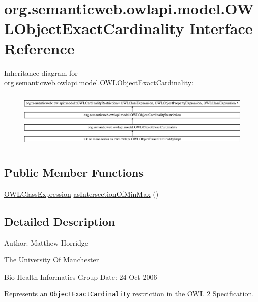 \hypertarget{interfaceorg_1_1semanticweb_1_1owlapi_1_1model_1_1_o_w_l_object_exact_cardinality}{\section{org.\-semanticweb.\-owlapi.\-model.\-O\-W\-L\-Object\-Exact\-Cardinality Interface Reference}
\label{interfaceorg_1_1semanticweb_1_1owlapi_1_1model_1_1_o_w_l_object_exact_cardinality}
}
Inheritance diagram for org.\-semanticweb.\-owlapi.\-model.\-O\-W\-L\-Object\-Exact\-Cardinality\-:\begin{figure}[H]
\begin{center}
\leavevmode
\includegraphics[height=2.758621cm]{interfaceorg_1_1semanticweb_1_1owlapi_1_1model_1_1_o_w_l_object_exact_cardinality}
\end{center}
\end{figure}
\subsection*{Public Member Functions}
\begin{DoxyCompactItemize}
\item 
\hyperlink{interfaceorg_1_1semanticweb_1_1owlapi_1_1model_1_1_o_w_l_class_expression}{O\-W\-L\-Class\-Expression} \hyperlink{interfaceorg_1_1semanticweb_1_1owlapi_1_1model_1_1_o_w_l_object_exact_cardinality_a5271b197bbf2006e374e4e0863425358}{as\-Intersection\-Of\-Min\-Max} ()
\end{DoxyCompactItemize}


\subsection{Detailed Description}
Author\-: Matthew Horridge\par
 The University Of Manchester\par
 Bio-\/\-Health Informatics Group Date\-: 24-\/\-Oct-\/2006 

Represents an \href{http://www.w3.org/TR/2009/REC-owl2-syntax-20091027/#Exact_Cardinality}{\tt Object\-Exact\-Cardinality} restriction in the O\-W\-L 2 Specification. 

